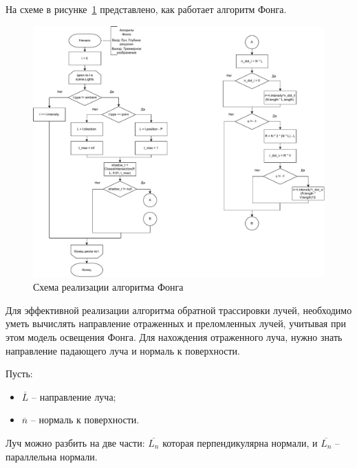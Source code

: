 На схеме в рисунке~\ref{fig:fongo} представлено, как работает алгоритм Фонга.
\FloatBarrier
\begin{figure}[h]
	\begin{center}
		\includegraphics[width=\linewidth]{photos/fonga.pdf}
	\end{center}
	\caption{Схема реализации алгоритма Фонга}
	\label{fig:fongo}
\end{figure}
\FloatBarrier

Для эффективной реализации алгоритма обратной трассировки лучей, необходимо уметь вычислять направление отраженных и преломленных лучей, учитывая при этом модель освещения Фонга. 
Для нахождения отраженного луча, нужно знать направление падающего луча и нормаль к поверхности.

Пусть: 
\begin{itemize}
	\item $\overline{L}$ -- направление луча;
	\item $\overline{n}$ -- нормаль к поверхности. 
\end{itemize}

Луч можно разбить на две части: $\overline{L_n}$ которая перпендикулярна нормали, и  $\overline{L_n}$ – параллельна нормали.

